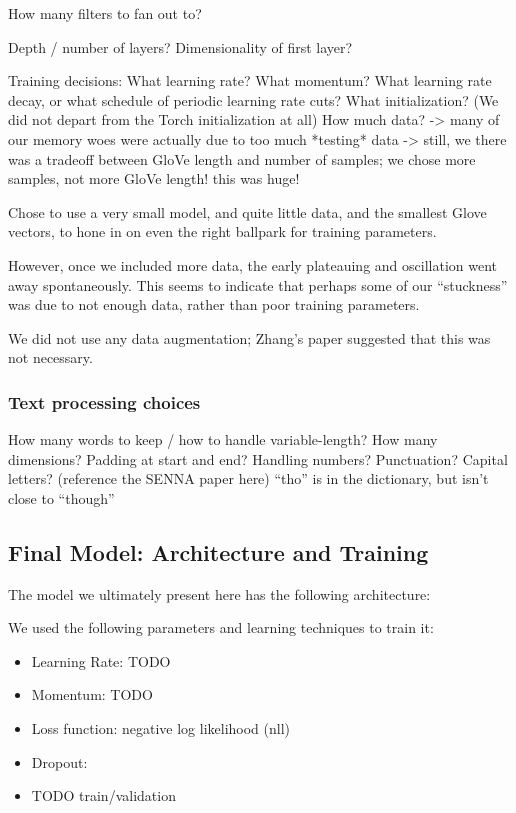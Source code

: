\documentclass{article}
\begin{document}
How many filters to fan out to?

Depth / number of layers?
Dimensionality of first layer?

Training decisions:
What learning rate?
What momentum?
What learning rate decay, or what schedule of periodic learning rate cuts?
What initialization? (We did not depart from the Torch initialization at all)
How much data?
-> many of our memory woes were actually due to too much *testing* data
-> still, we there was a tradeoff between GloVe length and number of samples; we chose more samples, not more GloVe length! this was huge!

Chose to use a very small model, and quite little data, and the smallest Glove vectors, to hone in on even the right ballpark for training parameters.

However, once we included more data, the early plateauing and oscillation went away spontaneously. This seems to indicate that perhaps some of our ``stuckness'' was due to not enough data, rather than poor training parameters.

We did not use any data augmentation; Zhang's paper suggested that this was not necessary.

\subsubsection*{Text processing choices}
How many words to keep / how to handle variable-length?
How many dimensions?
Padding at start and end?
Handling numbers?
Punctuation?
Capital letters? (reference the SENNA paper here)
``tho'' is in the dictionary, but isn't close to ``though''

\subsection*{Final Model: Architecture and Training}
\label{finalmodel}

The model we ultimately present here has the following architecture:

We used the following parameters and learning techniques to train it:
\begin{itemize}
\item Learning Rate: TODO
\item Momentum: TODO
\item Loss function: negative log likelihood (nll)
\item Dropout: 
\item TODO train/validation
\end{itemize}
\end{document}
